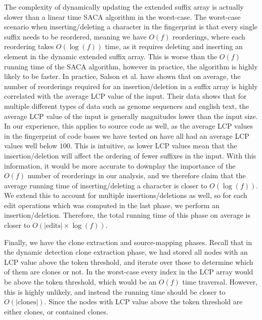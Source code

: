 The complexity of dynamically updating the extended suffix array is actually slower than a
linear time SACA algorithm in the worst-case. The worst-case scenario when
inserting/deleting a character in the fingerprint is that every single suffix needs to be
reordered, meaning we have $O(f)$ reorderings, where each reordering takes $O(\log(f))$
time, as it requires deleting and inserting an element in the dynamic extended suffix
array. This is worse than the $O(f)$ running time of the SACA algorithm, however in
practice, the algorithm is highly likely to be faster. In practice, Salson et
al.\cite{DynamicExtendedSuffixArraysReorderings} have shown that on average, the number of
reorderings required for an insertion/deletion in a suffix array is highly correlated with
the average LCP value of the input. Their data shows that for multiple different types of
data such as genome sequences and english text, the average LCP value of the input is
generally magnitudes lower than the input size. In our experience, this applies to source
code as well, as the average LCP values in the fingerprint of code bases we have tested on
have all had an average LCP values well below $100$. This is intuitive, as lower LCP
values mean that the insertion/deletion will affect the ordering of fewer suffixes in the
input. With this information, it would be more accurate to downplay the importance of the
$O(f)$ number of reorderings in our analysis, and we therefore claim that the average
running time of inserting/deleting a character is closer to $O(\log(f))$. We extend this
to account for multiple insertions/deletions as well, so for each edit operations which
was computed in the last phase, we perform an insertion/deletion. Therefore, the total
running time of this phase on average is closer to $O(\vert\text{edits}\vert \times
\log(f))$.



Finally, we have the clone extraction and source-mapping phases. Recall that in the
dynamic detection clone extraction phase, we had stored all nodes with an LCP value above
the token threshold, and iterate over those to determine which of them are clones or not.
In the worst-case every index in the LCP array would be above the token threshold, which
would be an $O(f)$ time traversal. However, this is highly unlikely, and instead the
running time should be closer to $O(\vert\text{clones}\vert)$. Since the nodes with LCP
value above the token threshold are either clones, or contained clones.

